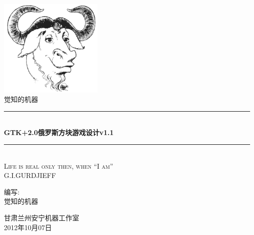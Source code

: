 

\newcommand{\HRule}{\rule{\linewidth}{0.5mm}}
\newenvironment{shell}{\footnotesize{}\linespread{0.9}\begin{shaded}}{\end{shaded}\linespread{1.0}\normalsize{}}

\setlength{\parindent}{2em}
\setlength{\fboxrule}{1pt}
\setlength{\fboxsep}{5pt}

\pagestyle{fancy}
\rfoot{\thepage} 
\renewcommand{\headrulewidth}{0.4pt} 
\renewcommand{\footrulewidth}{0.4pt}

\begin{titlepage}
  \begin{center}
    \includegraphics[width=2in]{images/gnu-head}
    \textsc{\LARGE }\\[1.5cm]
    \textsc{\Large 觉知的机器}\\[0.5cm]

    \HRule \\[0.4cm]
    {\LARGE \bfseries GTK+2.0俄罗斯方块游戏设计v1.1}\\[0.4cm]
    \HRule \\[1.0cm]
    \textsc{\large Life is real only then, when ``I am''\\
      \quad{}G.I.GURDJIEFF}\\[2.0cm]

    \begin{minipage}{0.4\textwidth}
      \begin{center} \large
        编\quad{}写:\\
        觉知的机器
      \end{center}
    \end{minipage}

    \vfill
    {\large 甘肃兰州安宁机器工作室}\\ 
    {\large 2012年10月07日}
  \end{center}
\end{titlepage}

